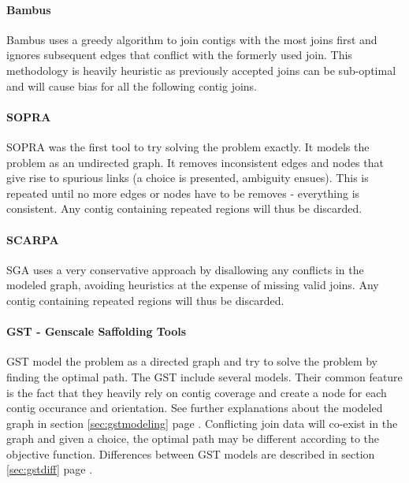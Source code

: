 \documentclass[12pt]{article}
\newcommand*{\fulleref}[1]{section \hyperref[{#1}] {\ref*{#1}} page {\pageref{#1}}}%
\begin{document}
\paragraph*{Bambus}
Bambus uses a greedy algorithm to join contigs with the most joins first and ignores subsequent edges that conflict with the formerly used join. This methodology is heavily heuristic as previously accepted joins can be sub-optimal and will cause bias for all the following contig joins.

\paragraph*{SOPRA} SOPRA was the first tool to try solving the problem exactly. It models the problem as an undirected graph. It removes inconsistent edges and nodes that give rise to spurious links (a choice is presented, ambiguity ensues). This is repeated until no more edges or nodes have to be removes - everything is consistent. Any contig containing repeated regions will thus be discarded.

\paragraph*{SCARPA} SGA uses a very conservative approach by disallowing any conflicts in the modeled graph, avoiding heuristics at the expense of missing valid joins. Any contig containing repeated regions will thus be discarded.

\paragraph*{GST - Genscale Saffolding Tools}
GST model the problem as a directed graph and try to solve the problem by finding the optimal path. The GST include several models. Their common feature is the fact that they heavily rely on contig coverage and create a node for each contig occurance and orientation. See further explanations about the modeled graph in \fulleref{sec:gstmodeling}. Conflicting join data will co-exist in the graph and given a choice, the optimal path may be different according to the objective function. Differences between GST models are described in \fulleref{sec:gstdiff}. 
\end{document}
